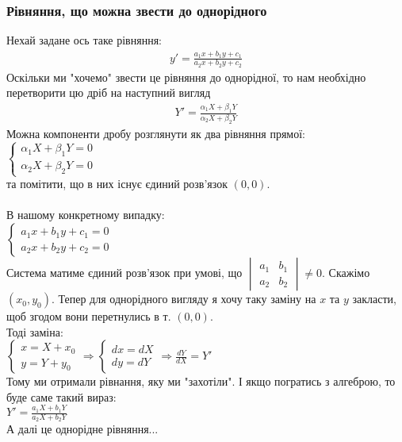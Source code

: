 \documentclass[a4paper, 10pt]{article}
\theoremstyle{theoremdd}
\theoremstyle{theoremdd}
\theoremstyle{theoremdd}
\theoremstyle{theoremdd}
\theoremstyle{theoremdd}
\theoremstyle{theoremdd}
\theoremstyle{theoremdd}
\theoremstyle{theoremdd}
\begin{document}
	\subsubsection{Рівняння, що можна звести до однорідного}
	Нехай задане ось таке рівняння:
	\begin{align*}
	y' = \frac{a_1 x + b_1 y + c_1}{a_2 x + b_2 y + c_2}
	\end{align*}
	Оскільки ми "хочемо" \hspace{0.1cm} звести це рівняння до однорідної, то нам необхідно перетворити цю дріб на наступний вигляд
	\begin{align*}
	Y' = \frac{\alpha_1 X + \beta_1 Y}{\alpha_2 X + \beta_2 Y}
	\end{align*}
	Можна компоненти дробу розглянути як два рівняння прямої:\\
	$\begin{cases}
	\alpha_1 X + \beta_1 Y = 0\\
	\alpha_2 X + \beta_2 Y = 0
	\end{cases}
	$\\
	та помітити, що в них існує єдиний розв'язок $(0,0)$.\\ \\
	В нашому конкретному випадку:\\
	$\begin{cases}
	a_1 x + b_1 y + c_1 = 0\\
	a_2 x + b_2 y + c_2 = 0
	\end{cases}
	$\\
	Система матиме єдиний розв'язок при умові, що $\begin{vmatrix} a_1 & b_1 \\ a_2 & b_2 \end{vmatrix} \neq 0$. Скажімо $(x_0, y_0)$. Тепер для однорідного вигляду я хочу таку заміну на $x$ та $y$ закласти, щоб згодом вони перетнулись в т. $(0,0)$.\\
	Тоді заміна:\\
	$\begin{cases}
	x = X + x_0\\
	y = Y + y_0
	\end{cases} \Rightarrow
	\begin{cases}
	dx = dX\\
	dy = dY
	\end{cases}
	\Rightarrow \displaystyle \frac{dY}{dX} = Y'
	$\\
	Тому ми отримали рівнання, яку ми "захотіли". І якщо погратись з алгеброю, то буде саме такий вираз:\\
	$\displaystyle Y' = \frac{a_1 X + b_1 Y}{a_2 X + b_2 Y}$\\
	А далі це однорідне рівняння...
	
\end{document}
